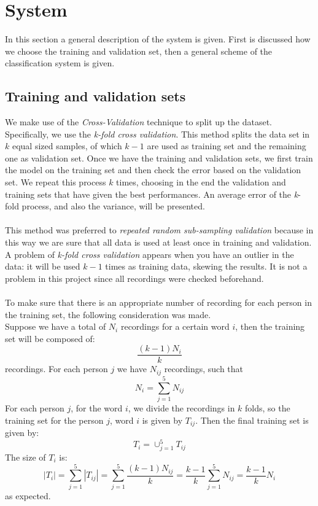 
\section{System}
In this section a general description of the system is given. First is discussed how we choose the training and validation set, then a general scheme of the classification system is given.
\subsection{Training and validation sets}
We make use of the \textit{Cross-Validation} technique to split up the dataset. Specifically, we use the \textit{k-fold cross validation}. This method splits the data set in $k$ equal sized samples, of which $k-1$ are used as training set and the remaining one as validation set. Once we have the training and validation sets, we first train the model on the training set and then check the error based on the validation set. We repeat this process $k$ times, choosing in the end the validation and training sets that have given the best performances. An average error of the \textit{k}-fold process, and also the variance, will be presented.\\ \\
This method was preferred to \textit{repeated random sub-sampling validation} because in this way we are sure that all data is used at least once in training and validation. A problem of \textit{k-fold cross validation} appears when you have an outlier in the data: it will be used $k-1$ times as training data, skewing the results. It is not a problem in this project since all recordings were checked beforehand.\\ \\
To make sure that there is an appropriate number of recording for each person in the training set, the following consideration was made.\\ Suppose we have a total of $N_i$ recordings for a certain word $i$, then the training set will be composed of: $$\frac{(k-1)N_i}{k}$$ recordings. For each person $j$ we have $N_{ij}$ recordings, such that $$N_i=\sum_{j=1}^{5} N_{ij}$$
For each person $j$, for the word $i$, we divide the recordings in $k$ folds, so the training set for the person $j$, word $i$ is given by $T_{ij}$. Then the final training set is given by:
$$T_i = {\cup_{j=1}^{5}T_{ij}}$$
The size of $T_i$ is:
$$|T_i| = \sum_{j=1}^{5} |T_{ij}| = \sum_{j=1}^5 \frac{(k-1)N_{ij}}{k} = \frac{k-1}{k}\sum_{j=1}^5 N_{ij}= \frac{k-1}{k}N_i$$
as expected.
\newpage
